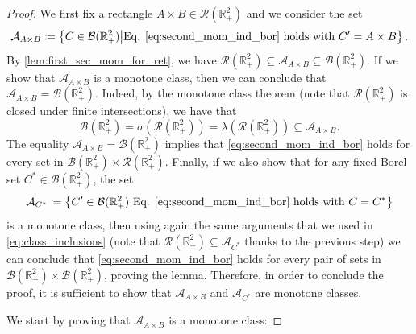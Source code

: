 \documentclass[10pt,a4paper]{amsart}
\def\R{\mathbb{R}}
\begin{document}
\begin{proof}
We first fix a rectangle $A\times B\in\mathcal{R}(\R_+^2)$ and we consider the set
\begin{equation}
\mathcal{A}_{A\times B}\coloneqq \left\{C\in\mathcal{B}(\R_+^2)\middle |\text{Eq. }\eqref{eq:second_mom_ind_bor} \text{ holds with } C'=A\times B \right\}.
\end{equation}
By \cref{lem:first_sec_mom_for_ret}, we have $\mathcal{R}(\R_+^2)\subseteq\mathcal{A}_{A\times B}\subseteq \mathcal{B}(\R_+^2)$.  If we show that $\mathcal{A}_{A\times B}$ is a monotone class, then we can conclude that $\mathcal{A}_{A\times B}=\mathcal{B}(\R_+^2)$. Indeed, by the monotone class theorem (note that $\mathcal{R}(\R_+^2)$ is closed under finite intersections), we have that
\begin{equation}\label{eq:class_inclusions}
\mathcal{B}(\R_+^2)= \sigma\left(\mathcal{R}(\R_+^2)\right)=\lambda\left(\mathcal{R}(\R_+^2)\right) \subseteq\mathcal{A}_{A\times B}.
\end{equation}
The equality $\mathcal{A}_{A\times B}=\mathcal{B}(\R_+^2)$ implies that \cref{eq:second_mom_ind_bor} holds for every set in $\mathcal{B}(\R_+^2)\times \mathcal{R}(\R_+^2)$. Finally, if we also show that for any fixed Borel set $C^*\in\mathcal{B}(\R_+^2)$, the set
\begin{equation}
\mathcal{A}_{C^*}\coloneqq \left\{C'\in\mathcal{B}(\R_+^2)\middle |\text{Eq. }\eqref{eq:second_mom_ind_bor} \text{ holds with } C=C^* \right\}
\end{equation}
is a monotone class, then using again the same arguments that we used in \cref{eq:class_inclusions} (note that $\mathcal{R}(\R_+^2)\subseteq\mathcal{A}_{C^*}$ thanks to the previous step) we can conclude that \cref{eq:second_mom_ind_bor} holds for every pair of sets in $\mathcal{B}(\R_+^2)\times \mathcal{B}(\R_+^2)$, proving the lemma. Therefore, in order to conclude the proof, it is sufficient to show that $\mathcal{A}_{A \times B}$ and $\mathcal{A}_{C^*}$ are monotone classes.

\medskip


We start by proving that $\mathcal{A}_{A\times B}$ is a monotone class:


\end{proof}
\end{document}
